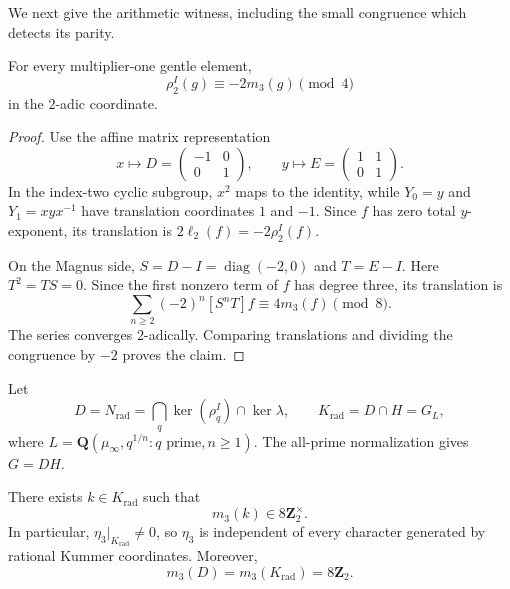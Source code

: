 We next give the arithmetic witness, including the small congruence
which detects its parity.

\begin{lemma}
\label{lem:rho2-cubic-modfour}
For every multiplier-one gentle element,
\[
 \rho_2^I(g)\equiv-2m_3(g)\pmod4
\]
in the $2$-adic coordinate.
\end{lemma}

\begin{proof}
Use the affine matrix representation
\[
 x\longmapsto D=\begin{pmatrix}-1&0\\0&1\end{pmatrix},\qquad
 y\longmapsto E=\begin{pmatrix}1&1\\0&1\end{pmatrix}.
\]
In the index-two cyclic subgroup, $x^2$ maps to the identity, while
$Y_0=y$ and $Y_1=xyx^{-1}$ have translation coordinates $1$ and $-1$.
Since $f$ has zero total $y$-exponent, its translation is
$2\ell_2(f)=-2\rho_2^I(f)$.

On the Magnus side, $S=D-I=\operatorname{diag}(-2,0)$ and $T=E-I$.
Here $T^2=TS=0$.  Since the first nonzero term of $f$ has degree
three, its translation is
\[
 \sum_{n\ge2}(-2)^n[S^nT]f\equiv4m_3(f)\pmod8.
\]
The series converges $2$-adically.  Comparing translations and
dividing the congruence by $-2$ proves the claim.
\end{proof}

Let
\[
 D=N_{\mathrm{rad}}=\bigcap_q\ker(\rho_q^I)\cap\ker\lambda,
 \qquad
 K_{\mathrm{rad}}=D\cap H=G_L,
\]
where $L=\mathbf Q(\mu_\infty,q^{1/n}:q\text{ prime},n\ge1)$.
The all-prime normalization gives $G=DH$.

\begin{proposition}
\label{prop:cubic-arithmetic-witness}
There exists $k\in K_{\mathrm{rad}}$ such that
\[
 m_3(k)\in8\mathbf Z_2^\times.
\]
In particular, $\eta_3|_{K_{\mathrm{rad}}}\ne0$, so $\eta_3$ is
independent of every character generated by rational Kummer coordinates.
Moreover,
\[
 m_3(D)=m_3(K_{\mathrm{rad}})=8\mathbf Z_2.
\]
\end{proposition}

